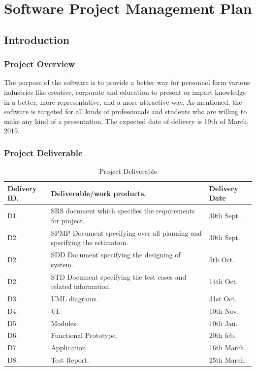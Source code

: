 \chapter{Software Project Management Plan }
\section {Introduction}
\subsection{Project Overview}
The purpose of the software is to provide a better way for personnel form various industries like creative, corporate and education to present or impart knowledge in a better, more representative, and a more attractive way. As mentioned, the software is targeted for all kinds of professionals and students who are willing to make any kind of a presentation. The expected date of delivery is 19th of March, 2019.
\newpage
\subsection{Project Deliverable}
\begin{table}[h!]
\caption{Project Deliverable}
  \centering
  \begin{tabular}{ |p{2.3cm}| p{8cm} | p{3cm} | }
\hline
    Delivery ID. & Deliverable/work products.& Delivery Date\\
    \hline
    D1. & SRS document which specifies the requirements for project.& 30th Sept..\\
 \hline
    D2. & SPMP Document specifying over all planning and specifying the estimation.& 30th Sept.\\
 \hline
  D2. & SDD Document specifying the designing of system.& 5th Oct.\\
 \hline
  D2. & STD Document specifying the test cases and related information.& 14th Oct.\\
 \hline
    D3. & UML diagrams.& 31st Oct.\\
 \hline
    D4. & UI.& 10th Nov.\\
 \hline
    D5. & Modules.& 10th Jan.\\
 \hline
    D6. &Functional Prototype.& 20th feb.\\
 \hline
   D7. &Application.& 16th March.\\
 \hline
   D8. &Test Report.& 25th March.\\
 \hline
  \end{tabular}
\end{table}
\newpage
